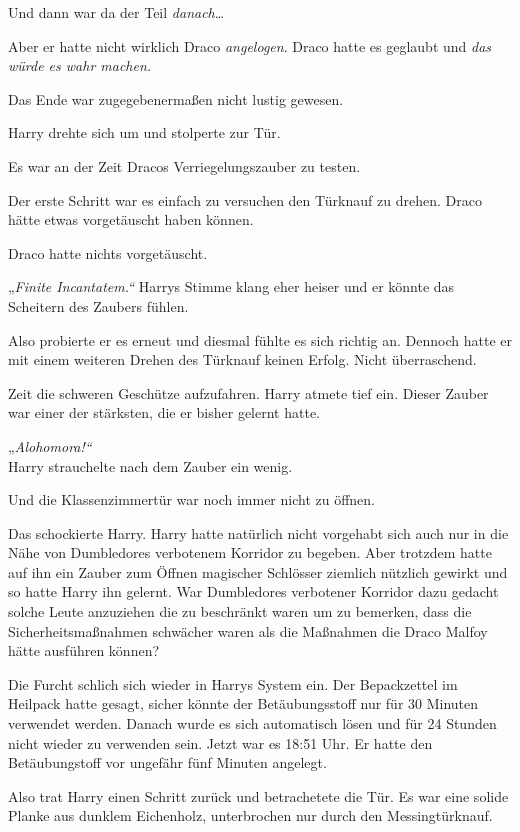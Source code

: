 {Und dann war da der Teil \emph{danach}…

Aber er hatte nicht wirklich Draco \emph{angelogen}. Draco hatte es geglaubt und \emph{das würde es wahr machen.}

Das Ende war zugegebenermaßen nicht lustig gewesen.

Harry drehte sich um und stolperte zur Tür.

Es war an der Zeit Dracos Verriegelungszauber zu testen.

Der erste Schritt war es einfach zu versuchen den Türknauf zu drehen. Draco hätte etwas vorgetäuscht haben können.

Draco hatte nichts vorgetäuscht.

„\emph{Finite Incantatem.“} Harrys Stimme klang eher heiser und er könnte das Scheitern des Zaubers fühlen.

Also probierte er es erneut und diesmal fühlte es sich richtig an. Dennoch hatte er mit einem weiteren Drehen des Türknauf keinen Erfolg. Nicht überraschend.

Zeit die schweren Geschütze aufzufahren. Harry atmete tief ein. Dieser Zauber war einer der stärksten, die er bisher gelernt hatte.

„\emph{Alohomora!“}\\ Harry strauchelte nach dem Zauber ein wenig.

Und die Klassenzimmertür war noch immer nicht zu öffnen.

Das schockierte Harry. Harry hatte natürlich nicht vorgehabt sich auch nur in die Nähe von Dumbledores verbotenem Korridor zu begeben. Aber trotzdem hatte auf ihn ein Zauber zum Öffnen magischer Schlösser ziemlich nützlich gewirkt und so hatte Harry ihn gelernt. War Dumbledores verbotener Korridor dazu gedacht solche Leute anzuziehen die zu beschränkt waren um zu bemerken, dass die Sicherheitsmaßnahmen schwächer waren als die Maßnahmen die Draco Malfoy hätte ausführen können?

Die Furcht schlich sich wieder in Harrys System ein. Der Bepackzettel im Heilpack hatte gesagt, sicher könnte der Betäubungsstoff nur für 30 Minuten verwendet werden. Danach wurde es sich automatisch lösen und für 24 Stunden nicht wieder zu verwenden sein. Jetzt war es 18:51 Uhr. Er hatte den Betäubungstoff vor ungefähr fünf Minuten angelegt.

Also trat Harry einen Schritt zurück und betrachetete die Tür. Es war eine solide Planke aus dunklem Eichenholz, unterbrochen nur durch den Messingtürknauf.

}
